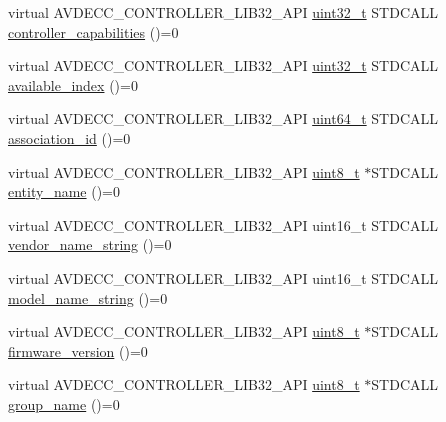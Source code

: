\begin{DoxyCompactItemize}
\item 
virtual A\+V\+D\+E\+C\+C\+\_\+\+C\+O\+N\+T\+R\+O\+L\+L\+E\+R\+\_\+\+L\+I\+B32\+\_\+\+A\+PI \hyperlink{parse_8c_a6eb1e68cc391dd753bc8ce896dbb8315}{uint32\+\_\+t} S\+T\+D\+C\+A\+LL \hyperlink{classavdecc__lib_1_1entity__descriptor__response_a8b16dfca0794fd6a5c11d6f9554a022f}{controller\+\_\+capabilities} ()=0
\item 
virtual A\+V\+D\+E\+C\+C\+\_\+\+C\+O\+N\+T\+R\+O\+L\+L\+E\+R\+\_\+\+L\+I\+B32\+\_\+\+A\+PI \hyperlink{parse_8c_a6eb1e68cc391dd753bc8ce896dbb8315}{uint32\+\_\+t} S\+T\+D\+C\+A\+LL \hyperlink{classavdecc__lib_1_1entity__descriptor__response_ae420519d363123bdfade9b0b82fa368e}{available\+\_\+index} ()=0
\item 
virtual A\+V\+D\+E\+C\+C\+\_\+\+C\+O\+N\+T\+R\+O\+L\+L\+E\+R\+\_\+\+L\+I\+B32\+\_\+\+A\+PI \hyperlink{parse_8c_aec6fcb673ff035718c238c8c9d544c47}{uint64\+\_\+t} S\+T\+D\+C\+A\+LL \hyperlink{classavdecc__lib_1_1entity__descriptor__response_a44437c541693e7aa1cea4af9f6bf3d1a}{association\+\_\+id} ()=0
\item 
virtual A\+V\+D\+E\+C\+C\+\_\+\+C\+O\+N\+T\+R\+O\+L\+L\+E\+R\+\_\+\+L\+I\+B32\+\_\+\+A\+PI \hyperlink{stdint_8h_aba7bc1797add20fe3efdf37ced1182c5}{uint8\+\_\+t} $\ast$S\+T\+D\+C\+A\+LL \hyperlink{classavdecc__lib_1_1entity__descriptor__response_a3abd11ceacbf37b685377f2b73a502ca}{entity\+\_\+name} ()=0
\item 
virtual A\+V\+D\+E\+C\+C\+\_\+\+C\+O\+N\+T\+R\+O\+L\+L\+E\+R\+\_\+\+L\+I\+B32\+\_\+\+A\+PI uint16\+\_\+t S\+T\+D\+C\+A\+LL \hyperlink{classavdecc__lib_1_1entity__descriptor__response_a435b2f9c9f69b0abebda21b3ef347697}{vendor\+\_\+name\+\_\+string} ()=0
\item 
virtual A\+V\+D\+E\+C\+C\+\_\+\+C\+O\+N\+T\+R\+O\+L\+L\+E\+R\+\_\+\+L\+I\+B32\+\_\+\+A\+PI uint16\+\_\+t S\+T\+D\+C\+A\+LL \hyperlink{classavdecc__lib_1_1entity__descriptor__response_ae7368a4664a265e6bc7e9b7a74f97f0f}{model\+\_\+name\+\_\+string} ()=0
\item 
virtual A\+V\+D\+E\+C\+C\+\_\+\+C\+O\+N\+T\+R\+O\+L\+L\+E\+R\+\_\+\+L\+I\+B32\+\_\+\+A\+PI \hyperlink{stdint_8h_aba7bc1797add20fe3efdf37ced1182c5}{uint8\+\_\+t} $\ast$S\+T\+D\+C\+A\+LL \hyperlink{classavdecc__lib_1_1entity__descriptor__response_a77abe180f1f91161e92abd718540e8ad}{firmware\+\_\+version} ()=0
\item 
virtual A\+V\+D\+E\+C\+C\+\_\+\+C\+O\+N\+T\+R\+O\+L\+L\+E\+R\+\_\+\+L\+I\+B32\+\_\+\+A\+PI \hyperlink{stdint_8h_aba7bc1797add20fe3efdf37ced1182c5}{uint8\+\_\+t} $\ast$S\+T\+D\+C\+A\+LL \hyperlink{classavdecc__lib_1_1entity__descriptor__response_a207bace822bc8f687c54d2f6ba61c252}{group\+\_\+name} ()=0

\end{DoxyCompactItemize}
